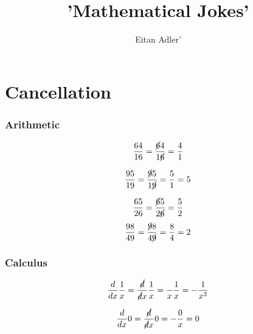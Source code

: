 \documentclass{article}
\title{'Mathematical Jokes'}
\author{Eitan Adler'}
\begin{document}
\maketitle


\section{Cancellation}
\subsubsection{Arithmetic}

\begin{equation}
	\begin{split}
		\frac{64}{16}
		=
		\frac{\cancel{6}4}{1\cancel{6}}
		=
		\frac{4}{1}
	\end{split}
\end{equation}

\begin{equation}
	\begin{split}
		\frac{95}{19}
		=
		\frac{\cancel{9}5}{1\cancel{9}}
		=
		\frac{5}{1}
		=
		5
	\end{split}
\end{equation}

\begin{equation}
	\begin{split}
		\frac{65}{26}
		=
		\frac{\cancel{6}5}{2\cancel{6}}
		=
		\frac{5}{2}
	\end{split}
\end{equation}
\begin{equation}
	\begin{split}
		\frac{98}{49}
		=
		\frac{\cancel{9}8}{4\cancel{9}}
		=
		\frac{8}{4}
		=
		2
	\end{split}
\end{equation}

\subsubsection{Calculus}
\begin{equation}
	\begin{split}
		\frac{d}{dx}
		\frac{1}{x}
		=
		\frac{\cancel{d}}{\cancel{d}x}
		\frac{1}{x}
		=
		\frac{}{x}
		\frac{1}{x}
		=
		- \frac{1}{x^2}
	\end{split}
\end{equation}

\begin{equation}
	\begin{split}
		\frac{d}{dx} 0 =
		\frac{\cancel{d}}{\cancel{d}x} 0
		=
		-\frac{0}{x}
		=
		0
	\end{split}
\end{equation}
\end{document}

